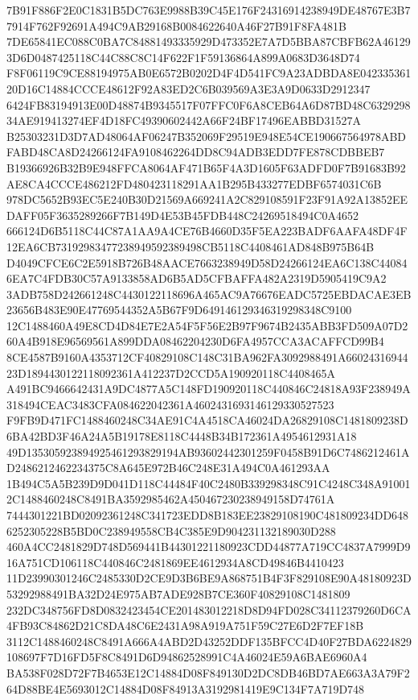 \documentclass[UTF8,fontset=fandol,zihao=-4,a4paper]{ctexart}
\begin{document}
{{7B91F886F2E0C1831B5DC763E9988B39C45E176F24316914238949DE48767E3B77914F762F92691A494C9AB29168B0084622640A46F27B91F8FA481B
7DE65841EC088C0BA7C84881493335929D473352E7A7D5BBA87CBFB62A461293D6D0487425118C44C88C8C14F622F1F59136864A899A0683D3648D74
F8F06119C9CE88194975AB0E6572B0202D4F4D541FC9A23ADBDA8E04233536120D16C14884CCCE48612F92A83ED2C6B039569A3E3A9D0633D2912347
6424FB83194913E00D48874B9345517F07FFC0F6A8CEB64A6D87BD48C632929834AE919413274EF4D18FC49390602442A66F24BF17496EABBD31527A
B25303231D3D7AD48064AF06247B352069F29519E948E54CE190667564978ABDFABD48CA8D24266124FA9108462264DD8C94ADB3EDD7FE878CDBBEB7
B19366926B32B9E948FFCA8064AF471B65F4A3D1605F63ADFD0F7B91683B92AE8CA4CCCE486212FD480423118291AA1B295B433277EDBF6574031C6B
978DC5652B93EC5E240B30D21569A669241A2C829108591F23F91A92A13852EEDAFF05F3635289266F7B149D4E53B45FDB448C24269518494C0A4652
666124D6B5118C44C87A1AA9A4CE76B4660D35F5EA223BADF6AAFA48DF4F12EA6CB73192983477238949592389498CB5118C4408461AD848B975B64B
D4049CFCE6C2E5918B726B48AACE7663238949D58D24266124EA6C138C440846EA7C4FDB30C57A9133858AD6B5AD5CFBAFFA482A2319D5905419C9A2
3ADB758D242661248C4430122118696A465AC9A76676EADC5725EBDACAE3EB23656B483E90E47769544352A5B67F9D649146129346319298348C9100
12C1488460A49E8CD4D84E7E2A54F5F56E2B97F9674B2435ABB3FD509A07D260A4B918E96569561A899DDA08462204230D6FA4957CCA3ACAFFCD99B4
8CE4587B9160A4353712CF40829108C148C31BA962FA3092988491A6602431694423D1894430122118092361A412237D2CCD5A190920118C4408465A
A491BC9466642431A9DC4877A5C148FD190920118C440846C24818A93F238949A318494CEAC3483CFA084622042361A4602431693146129330527523
F9FB9D471FC1488460248C34AE91C4A4518CA46024DA26829108C1481809238D6BA42BD3F46A24A5B19178E8118C4448B34B172361A4954612931A18
49D135305923894925461293829194AB93602442301259F0458B91D6C7486212461AD2486212462234375C8A645E972B46C248E31A494C0A461293AA
1B494C5A5B239D9D041D118C44484F40C2480B339298348C91C4248C348A910012C1488460248C8491BA3592985462A450467230238949158D74761A
7444301221BD02092361248C341723EDD8B183EE23829108190C481809234DD6486252305228B5BD0C238949558CB4C385E9D904231132189030D288
460A4CC2481829D748D569441B44301221180923CDD44877A719CC4837A7999D916A751CD106118C440846C2481869EE4612934A8CD49846B4410423
11D23990301246C2485330D2CE9D3B6BE9A868751B4F3F829108E90A48180923D53292988491BA32D24E975AB7ADE928B7CE360F40829108C1481809
232DC348756FD8D0832423454CE201483012218D8D94FD028C34112379260D6CA4FB93C84862D21C8DA48C6E2431A98A919A751F59C27E6D2F7EF18B
3112C1488460248C8491A666A4ABD2D43252DDF135BFCC4D40F27BDA6224829108697F7D16FD5F8C8491D6D94862528991C4A46024E59A6BAE6960A4
BA538F028D72F7B4653E12C14884D08F849130D2DC8DB46BD7AE663A3A79F264D88BE4E5693012C14884D08F84913A3192981419E9C134F7A719D748
}}
\end{document}
